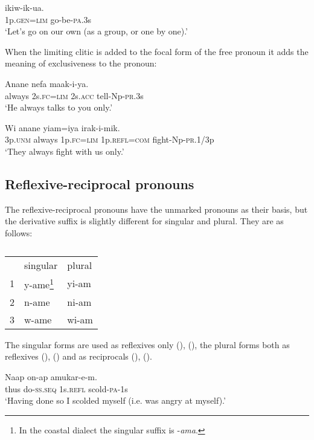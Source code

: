 \ea%
\label{ex:x607}
\gll {} ikiw-ik-ua. \\
1p.\textsc{gen}=\textsc{lim} go-be-\textsc{pa}.3s\\
\glt`Let's go on our own (as a group, or one by one).'
\z

When the limiting clitic is added to the focal form of the free pronoun it adds the meaning of exclusiveness to the pronoun:

\ea%
\label{ex:x608}
\gll Anane  nefa maak-i-ya. \\
always 2s.\textsc{fc}=\textsc{lim} 2s.\textsc{acc} tell-Np-\textsc{pr}.3s\\
\glt`He always talks to you only.'
\z

\ea%
\label{ex:x609}
\gll Wi anane  yiam=iya irak-i-mik. \\
3p.\textsc{unm} always 1p.\textsc{fc}=\textsc{lim} 1p.\textsc{refl}=\textsc{com} fight-Np-\textsc{pr}.1/3p\\
\glt`They always fight with us only.'
\z

\subsection{Reflexive-reciprocal pronouns}
{}
The reflexive-reciprocal pronouns have the unmarked pronouns as their basis, but the derivative suffix is slightly different for singular and plural. They are as follows:

\begin{table}
\caption{}
\label{} 
\begin{tabular}{lll}
 &singular &plural\\
1 &y-ame\footnote{In the coastal dialect the singular suffix is -\textit{ama}.} &yi-am\\
2 &n-ame &ni-am\\
3 &w-ame &wi-am\\
\end{tabular}
\end{table}


The singular forms are used as reflexives only (), (), the plural forms both as reflexives (), () and as reciprocals (), ().

\ea%
\label{ex:x610}
\gll Naap on-ap  amukar-e-m. \\
thus do-\textsc{ss}.\textsc{seq} 1s.\textsc{refl} scold-\textsc{pa}-1s\\
\glt`Having done so I scolded myself (i.e. was angry at myself).'
\z

